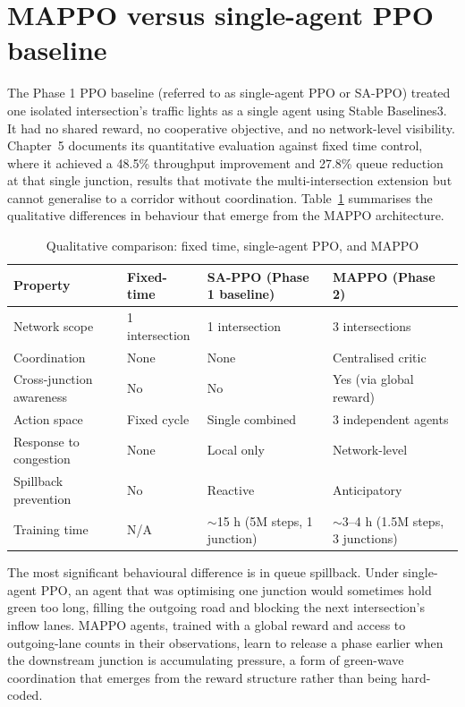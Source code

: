 ﻿\documentclass[11pt, a4paper]{report}
\begin{document}
\section{MAPPO versus single-agent PPO baseline}

The Phase 1 PPO baseline (referred to as single-agent PPO or SA-PPO) treated one isolated intersection's traffic lights as a single agent using Stable Baselines3. It had no shared reward, no cooperative objective, and no network-level visibility. Chapter~5 documents its quantitative evaluation against fixed time control, where it achieved a 48.5\% throughput improvement and 27.8\% queue reduction at that single junction, results that motivate the multi-intersection extension but cannot generalise to a corridor without coordination. Table~\ref{tab:mappo_vs_ppo} summarises the qualitative differences in behaviour that emerge from the MAPPO architecture.

\begin{table}[H]
\centering
\caption{Qualitative comparison: fixed time, single-agent PPO, and MAPPO}
\label{tab:mappo_vs_ppo}
\begin{tabular}{p{3.2cm}p{3.5cm}p{3.5cm}p{3.5cm}}
\toprule
\textbf{Property} & \textbf{Fixed-time} & \textbf{SA-PPO (Phase 1 baseline)} & \textbf{MAPPO (Phase 2)} \\
\midrule
Network scope & 1 intersection & 1 intersection & 3 intersections \\
Coordination & None & None & Centralised critic \\
Cross-junction awareness & No & No & Yes (via global reward) \\
Action space & Fixed cycle & Single combined & 3 independent agents \\
Response to congestion & None & Local only & Network-level \\
Spillback prevention & No & Reactive & Anticipatory \\
Training time & N/A & ${\sim}$15 h (5M steps, 1 junction) & ${\sim}$3--4 h (1.5M steps, 3 junctions) \\
\bottomrule
\end{tabular}
\end{table}

The most significant behavioural difference is in queue spillback. Under single-agent PPO, an agent that was optimising one junction would sometimes hold green too long, filling the outgoing road and blocking the next intersection's inflow lanes. MAPPO agents, trained with a global reward and access to outgoing-lane counts in their observations, learn to release a phase earlier when the downstream junction is accumulating pressure, a form of green-wave coordination that emerges from the reward structure rather than being hard-coded.
\end{document}

